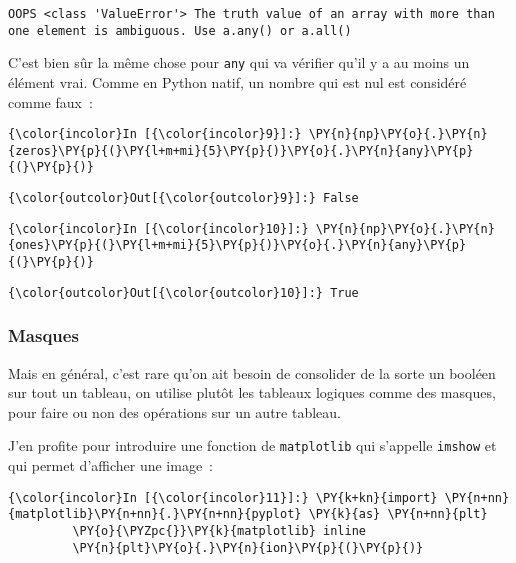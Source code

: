     \begin{Verbatim}[commandchars=\\\{\}]
OOPS <class 'ValueError'> The truth value of an array with more than one element is ambiguous. Use a.any() or a.all()

    \end{Verbatim}

    C'est bien sûr la même chose pour \texttt{any} qui va vérifier qu'il y a
au moins un élément vrai. Comme en Python natif, un nombre qui est nul
est considéré comme faux~:

    \begin{Verbatim}[commandchars=\\\{\}]
{\color{incolor}In [{\color{incolor}9}]:} \PY{n}{np}\PY{o}{.}\PY{n}{zeros}\PY{p}{(}\PY{l+m+mi}{5}\PY{p}{)}\PY{o}{.}\PY{n}{any}\PY{p}{(}\PY{p}{)}
\end{Verbatim}


\begin{Verbatim}[commandchars=\\\{\}]
{\color{outcolor}Out[{\color{outcolor}9}]:} False
\end{Verbatim}
            
    \begin{Verbatim}[commandchars=\\\{\}]
{\color{incolor}In [{\color{incolor}10}]:} \PY{n}{np}\PY{o}{.}\PY{n}{ones}\PY{p}{(}\PY{l+m+mi}{5}\PY{p}{)}\PY{o}{.}\PY{n}{any}\PY{p}{(}\PY{p}{)}
\end{Verbatim}


\begin{Verbatim}[commandchars=\\\{\}]
{\color{outcolor}Out[{\color{outcolor}10}]:} True
\end{Verbatim}
            
    \hypertarget{masques}{%
\subsubsection{Masques}\label{masques}}

    Mais en général, c'est rare qu'on ait besoin de consolider de la sorte
un booléen sur tout un tableau, on utilise plutôt les tableaux logiques
comme des masques, pour faire ou non des opérations sur un autre
tableau.

    J'en profite pour introduire une fonction de \texttt{matplotlib} qui
s'appelle \texttt{imshow} et qui permet d'afficher une image~:

    \begin{Verbatim}[commandchars=\\\{\}]
{\color{incolor}In [{\color{incolor}11}]:} \PY{k+kn}{import} \PY{n+nn}{matplotlib}\PY{n+nn}{.}\PY{n+nn}{pyplot} \PY{k}{as} \PY{n+nn}{plt}
         \PY{o}{\PYZpc{}}\PY{k}{matplotlib} inline
         \PY{n}{plt}\PY{o}{.}\PY{n}{ion}\PY{p}{(}\PY{p}{)}
\end{Verbatim}


